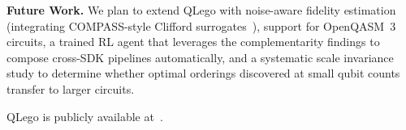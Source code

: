 \documentclass[conference]{IEEEtran}
\begin{document}
\textbf{Future Work.}
We plan to extend QLego with noise-aware fidelity estimation (integrating COMPASS-style Clifford surrogates~\cite{dangwal2024compass}), support for OpenQASM~3 circuits, a trained RL agent that leverages the complementarity findings to compose cross-SDK pipelines automatically, and a systematic scale invariance study to determine whether optimal orderings discovered at small qubit counts transfer to larger circuits.

QLego is publicly available at~\cite{repository}.

\printbibliography
\end{document}

